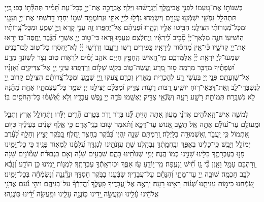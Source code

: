 \documentclass[twoside, openany, parskip=half, 11pt]{book}
\begin{document}
בְּשַׁנּוֹת֣וֹ אֶת־טַ֭עְמוֹ לִפְנֵ֣י אֲבִימֶ֑לֶךְ וַֽ֝יְגָֽרֲשֵׁ֗הוּ וַיֵּלַֽךְ׃ \hfill \break
אֲבָֽרֲכָ֣ה אֶת־יְיָ֣ בְּכָל־עֵ֑ת תָּ֝מִ֗יד תְּהִלָּ֘ת֥וֹ בְּפִֽי׃ \hfill \break
֖בַּֽיְיָ תִּתְהַלֵּ֣ל נַפְשִׁ֑י יִשְׁמְֿע֖וּ עֲנָוִ֣ים וְיִשְׂמָֽחוּ׃ \hfill \break
גַּדְּֿל֣וּ לַֽיְיָ֣ אִתִּ֑י וּנְֽרוֹמֲמָ֖ה שְׁמ֣וֹ יַחְדָּֽו׃ \hfill \break
דָּ֣רַשְׁתִּי אֶת־יְיָ֣ וְעָנָ֑נִי וּמִכָּל־מְ֝גֽוּרוֹתַ֗י הִצִּילָֽנִי׃ \hfill \break
הִבִּ֣יטוּ אֵלָ֣יו וְנָהָ֑רוּ וּ֝פְנֵיהֶ֗ם אַל־יֶחְפָּֽרוּ׃ \hfill \break
זֶ֤ה עָנִ֣י קָ֭רָא וַֽיְיָ֣ שָׁמֵ֑עַ וּמִכָּל־צָֽ֝רוֹתָ֗יו הֽוֹשִׁיעֽוֹ׃ \hfill \break
חֹנֶ֤ה מַלְאַךְ־יְיָ֓ סָ֘בִ֤יב לִֽ֝ירֵאָ֗יו וַֽיְחַלְּֿצֵֽם׃ \hfill \break
טַֽעֲמ֣וּ וּ֭רְאוּ כִּי־ט֣וֹב יְיָ֑ אַשְׁרֵ֥י הַ֝גֶּ֗בֶר יֶֽחֱסֶּה־בּֽוֹ׃ \hfill \break
יְר֣אוּ אֶת־יְיָ֣ קְדֹשָׁ֑יו כִּ֘י־אֵ֥ין מַ֝חְס֗וֹר לִֽירֵאָֽיו׃ \hfill \break
כְּ֭פִירִים רָשׁ֣וּ וְרָעֵ֑בוּ וְדֹֽרְֿשֵׁ֥י יְ֜יָ֗ לֹֽא־יַחְסְֿר֥וּ כָל־טֽוֹב׃ \hfill \break
לְֽכוּ־בָ֭נִים שִׁמְעוּ־לִי֑ יִרְאַ֥ת יְ֜יָ֗ אֲלַמֶּדְכֶֽם׃ \hfill \break
מִֽי־הָ֭אִישׁ הֶֽחָפֵ֣ץ חַיִּי֑ם אֹהֵ֥ב יָ֝מִ֗ים לִרְא֥וֹת טֽוֹב׃ \hfill \break
נְצֹ֣ר לְשֽׁוֹנְֿךָ֣ מֵרָ֑ע וּ֝שְׂפָתֶ֗יךָ מִדַּבֵּ֥ר מִרְמָֽה׃ \hfill \break
ס֣וּר מֵ֭רָע וַֽעֲשֵׂה־ט֑וֹב בַּקֵּ֖שׁ שָׁל֣וֹם וְרָדְפֵֽהוּ׃ \hfill \break
עֵינֵ֣י יְ֖יָ אֶל־צַדִּיקִ֑ים וְ֝אָזְנָ֗יו אֶל־שַׁוְעָתָֽם׃ \hfill \break
פְּנֵ֣י יְ֖יָ בְּעֹ֣שֵׂי רָ֑ע לְהַכְרִ֖ית מֵאֶ֣רֶץ זִכְרָֽם׃ \hfill \break
֖צָֽעֲקוּ וַֽיְיָ֣ שָׁמֵ֑עַ וּמִכָּל־צָֽ֝רוֹתָ֗ם הִצִּילָֽם׃ \hfill \break
קָר֣וֹב יְ֖יָ לְנִשְׁבְּֿרֵי־לֵ֑ב וְֽאֶת־דַּכְּֿאֵי־ר֥וּחַ יוֹשִֽׁיעַ׃ \hfill \break
רַ֭בּוֹת רָע֣וֹת צַדִּ֑יק וּ֝מִכֻּלָּ֗ם יַצִּילֶ֥נּוּ יְיָ׃ \hfill \break
שֹׁמֵ֥ר כָּל־עַצְמֹתָ֑יו אַחַ֥ת מֵ֝הֵ֗נָּה לֹ֣א נִשְׁבָּֽרָה׃ \hfill \break
תְּמוֹתֵ֣ת רָשָׁ֣ע רָעָ֑ה וְשֹֽׂנְֿאֵ֖י צַדִּ֣יק יֶאְשָֽׁמוּ׃ \hfill \break
{} 
פֹּדֶ֣ה יְ֖יָ נֶ֣פֶשׁ עֲבָדָ֑יו וְלֹ֥א יֶאְ֝שְֿׁמ֗וּ כָּל־הַֽחֹסִ֥ים בּֽוֹ׃


 
לְמֹשֶׁ֢ה אִישׁ־הָֽאֱלֹ֫הִ֥ים אֲדֹנָ֗י מָע֣וֹן אַ֭תָּה הָיִ֥יתָ לָּ֝֗נוּ בְּדֹ֣ר וָדֹֽר׃
בְּטֶ֤רֶם הָ֘רִ֤ים יֻלָּ֗דוּ וַתְּֿח֣וֹלֵֽל אֶ֣רֶץ וְתֵבֵ֑ל וּמֵֽעוֹלָ֥ם עַד־ע֝וֹלָ֗ם אַתָּ֥ה אֵֽל׃
תָּשֵׁ֣ב אֱ֭נוֹשׁ עַד־דַּכָּ֑א וַ֝תֹּ֗אמֶר שׁ֣וּבוּ בְנֵֽי־אָדָֽם׃
כִּ֤י אֶ֢לֶף שָׁנִ֡ים בְּעֵינֶ֗יךָ כְּי֣וֹם אֶ֭תְמוֹל כִּ֥י יַֽעֲבֹ֑ר וְֽאַשְׁמוּרָ֥ה בַלָּֽיְלָה׃
זְ֭רַמְתָּם שֵׁנָ֣ה יִֽהְי֑וּ בַּ֝בֹּ֗קֶר כֶּֽחָצִ֥ר יַֽחֲלֹֽף׃
בַּ֭בֹּֽקֶר יָצִ֣יץ וְחָלָ֑ף לָ֝עֶ֗רֶב יְמוֹלֵ֥ל וְיָבֵֽשׁ׃
כִּֽי־כָלִ֥ינוּ בְאַפֶּ֑ךָ וּבַֽחֲמָֽתְֿךָ֥ נִבְהָֽלְנוּ׃
שַׁתָּ֣ עֲוֹֽנֹתֵ֣ינוּ לְנֶגְדֶּ֑ךָ עֲ֝לֻמֵ֗נוּ לִמְא֥וֹר פָּנֶֽיךָ׃
כִּ֣י כָל־יָ֭מֵֽינוּ פָּנ֣וּ בְעֶבְרָתֶ֑ךָ כִּלִּ֖ינוּ שָׁנֵ֣ינוּ כְמוֹ־הֶֽגֶה׃
יְמֵ֤י שְׁנוֹ֙תֵינוּ בָהֶ֢ם שִׁבְעִ֥ים שָׁנָ֡ה וְאִ֤ם בִּגְבוּרֹ֨ת שְׁמ֘וֹנִ֤ים שָׁנָ֗ה וְ֭רָהְבָּם עָמָ֣ל וָאָ֑וֶן כִּ֘י גָ֥ז חִ֝֗ישׁ וַנָּעֻֽפָה׃
מִֽי־י֭וֹדֵֽעַ עֹ֥ז אַפֶּ֑ךָ וּכְיִרְאָֽתְֿךָ֥ עֶבְרָתֶֽךָ׃
לִמְנ֣וֹת יָ֭מֵינוּ כֵּ֥ן הוֹדַ֑ע וְ֝נָבִ֗א לְבַ֣ב חָכְמָֽה׃
שׁוּבָ֣ה יְ֖יָ עַד־מָתָ֑י וְ֝הִנָּחֵ֗ם עַל־עֲבָדֶֽיךָ׃
שַׂבְּֿעֵ֣נוּ בַבֹּ֣קֶר חַסְדֶּ֑ךָ וּנְרַֽ֘נֲנָ֥ה וְ֝נִשְׂמְֿחָ֗ה בְּכָל־יָמֵֽינוּ׃
שַׂ֭מְּֿחֵנוּ כִּימ֣וֹת עִנִּיתָ֑נוּ שְׁ֝נ֗וֹת רָאִ֥ינוּ רָעָֽה׃
יֵֽרָאֶ֣ה אֶל־֖עֲבָדֶיךָ פָֽעֳלֶ֑ךָ וַֽ֝הֲדָֽרְֿךָ֗ עַל־בְּנֵיהֶֽם׃
וִיהִ֤י נֹ֨עַם אֲדֹנָ֥י אֱלֹהֵ֗ינוּ עָ֫לֵ֥ינוּ וּמַֽעֲשֵׂ֣ה יָ֭דֵינוּ כּֽוֹנֲנָ֣ה עָלֵ֑ינוּ וּמַֽעֲשֵׂ֥ה יָ֝דֵ֗ינוּ כּֽוֹנֲנֵֽהוּ׃
\end{document}
